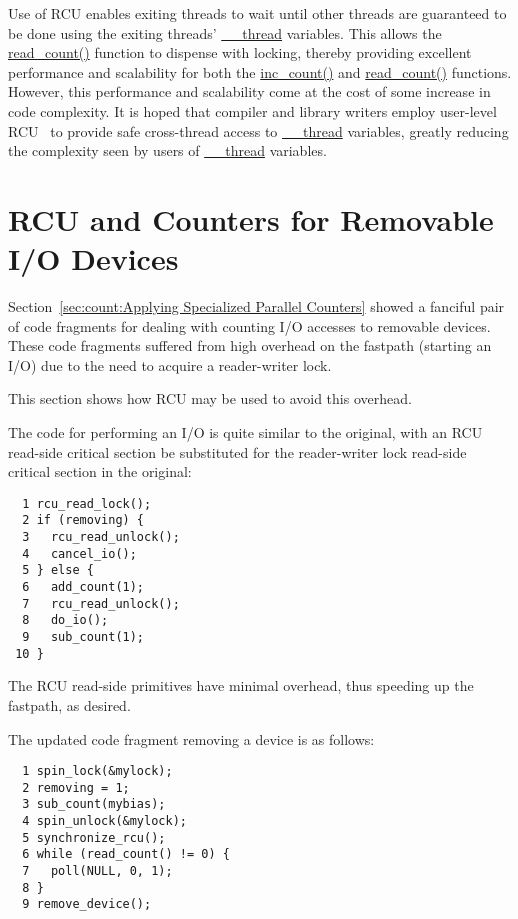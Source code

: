 Use of RCU enables exiting threads to wait until other threads are
guaranteed to be done using the exiting threads' \url{__thread} variables.
This allows the \url{read_count()} function to dispense with locking,
thereby providing
excellent performance and scalability for both the \url{inc_count()}
and \url{read_count()} functions.
However, this performance and scalability come at the cost of some increase
in code complexity.
It is hoped that compiler and library writers employ user-level
RCU~\cite{MathieuDesnoyers2009URCU} to provide safe cross-thread
access to \url{__thread} variables, greatly reducing the
complexity seen by users of \url{__thread} variables.

\section{RCU and Counters for Removable I/O Devices}
\label{sec:applyrcu:RCU and Counters for Removable I/O Devices}

Section~\ref{sec:count:Applying Specialized Parallel Counters}
showed a fanciful pair of code fragments for dealing with counting
I/O accesses to removable devices.
These code fragments suffered from high overhead on the fastpath
(starting an I/O) due to the need to acquire a reader-writer
lock.

This section shows how RCU may be used to avoid this overhead.

The code for performing an I/O is quite similar to the original, with
an RCU read-side critical section be substituted for the reader-writer
lock read-side critical section in the original:

\vspace{5pt}
\begin{minipage}[t]{\columnwidth}
\small
\begin{verbatim}
  1 rcu_read_lock();
  2 if (removing) {
  3   rcu_read_unlock();
  4   cancel_io();
  5 } else {
  6   add_count(1);
  7   rcu_read_unlock();
  8   do_io();
  9   sub_count(1);
 10 }
\end{verbatim}
\end{minipage}
\vspace{5pt}

The RCU read-side primitives have minimal overhead, thus speeding up
the fastpath, as desired.

The updated code fragment removing a device is as follows:

\vspace{5pt}
\begin{minipage}[t]{\columnwidth}
\small
\begin{verbatim}
  1 spin_lock(&mylock);
  2 removing = 1;
  3 sub_count(mybias);
  4 spin_unlock(&mylock);
  5 synchronize_rcu();
  6 while (read_count() != 0) {
  7   poll(NULL, 0, 1);
  8 }
  9 remove_device();
\end{verbatim}
\end{minipage}
\vspace{5pt}

